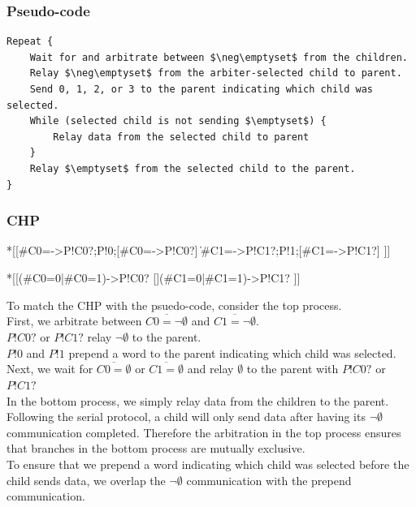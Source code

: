 \documentclass{article}
\begin{document}
\subsubsection*{Pseudo-code}

\begin{lstlisting}[mathescape]
Repeat {
    Wait for and arbitrate between $\neg\emptyset$ from the children.
    Relay $\neg\emptyset$ from the arbiter-selected child to parent.
    Send 0, 1, 2, or 3 to the parent indicating which child was selected.
    While (selected child is not sending $\emptyset$) {
        Relay data from the selected child to parent
    }
    Relay $\emptyset$ from the selected child to the parent.
}
\end{lstlisting}

\subsubsection*{CHP}

\begin{csp}
*[[#{C0=\neg\emptyset}->P!C0?;P!0;[#{C0=\emptyset}->P!C0?]
  \|#{C1=\neg\emptyset}->P!C1?;P!1;[#{C1=\emptyset}->P!C1?]
 ]]

*[[(#{C0=0}|#{C0=1})->P!C0?
  [](#{C1=0}|#{C1=1})->P!C1?
 ]]
\end{csp}

\noindent
To match the CHP with the psuedo-code, consider the top process. \\
First, we arbitrate between $\overline{C0=\neg\emptyset}$ and 
$\overline{C1=\neg\emptyset}$. \\
$P!C0?$ or $P!C1?$ relay $\neg\emptyset$ to the parent. \\
$P!0$ and $P!1$ prepend a word to the parent indicating which child was 
selected. \\
Next, we wait for $\overline{C0=\emptyset}$ or $\overline{C1=\emptyset}$ 
and relay $\emptyset$ to the parent with $P!C0?$ or $P!C1?$ \\

\noindent
In the bottom process, we simply relay data from the children to the parent.
Following the serial protocol, a child will only send data after having 
its $\neg\emptyset$ communication completed. Therefore the arbitration in
the top process ensures that branches in the bottom process are mutually 
exclusive. \\

\noindent
To ensure that we prepend a word indicating which child was selected before
the child sends data, we overlap the $\neg\emptyset$ communication with the 
prepend communication.
\end{document}
